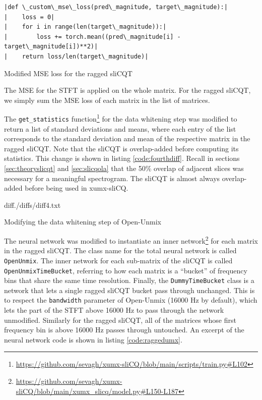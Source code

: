 \documentclass[report.tex]{subfiles}
\begin{document}
\begin{listing}[h]
  \centering
\begin{verbatim}
|def \_custom\_mse\_loss(pred\_magnitude, target\_magnitude):|
|    loss = 0|
|    for i in range(len(target\_magnitude)):|
|        loss += torch.mean((pred\_magnitude[i] - target\_magnitude[i])**2)|
|    return loss/len(target\_magnitude)|
\end{verbatim}
  \caption{Modified MSE loss for the ragged sliCQT}
  \label{code:simplemse}
\end{listing}

The MSE for the STFT is applied on the whole matrix. For the ragged sliCQT, we simply sum the MSE loss of each matrix in the list of matrices.

The \Verb#get_statistics# function\footnote{\url{https://github.com/sevagh/xumx-sliCQ/blob/main/scripts/train.py\#L102}} for the data whitening step was modified to return a list of standard deviations and means, where each entry of the list corresponds to the standard deviation and mean of the respective matrix in the ragged sliCQT. Note that the sliCQT is overlap-added before computing its statistics. This change is shown in listing \ref{code:fourthdiff}. Recall in sections \ref{sec:theoryslicqt} and \ref{sec:slicqola} that the 50\% overlap of adjacent slices was necessary for a meaningful spectrogram. The sliCQT is almost always overlap-added before being used in xumx-sliCQ.

\begin{listing}[ht]
  \centering
\begin{inputminted}[linenos,breaklines,frame=single,fontsize=\scriptsize]{diff}{./diffs/diff4.txt}
\end{inputminted}
  \caption{Modifying the data whitening step of Open-Unmix}
  \label{code:fourthdiff}
\end{listing}

The neural network was modified to instantiate an inner network\footnote{\url{https://github.com/sevagh/xumx-sliCQ/blob/main/xumx_slicq/model.py\#L150-L187}} for each matrix in the ragged sliCQT. The class name for the total neural network is called \Verb#OpenUnmix#. The inner network for each sub-matrix of the sliCQT is called \Verb#OpenUnmixTimeBucket#, referring to how each matrix is a ``bucket'' of frequency bins that share the same time resolution. Finally, the \Verb#DummyTimeBucket# class is a network that lets a single ragged sliCQT bucket pass through unchanged. This is to respect the \Verb#bandwidth# parameter of Open-Unmix (16000 Hz by default), which lets the part of the STFT above 16000 Hz to pass through the network unmodified. Similarly for the ragged sliCQT, all of the matrices whose first frequency bin is above 16000 Hz passes through untouched. An excerpt of the neural network code is shown in listing \ref{code:raggedumx}.
\end{document}
